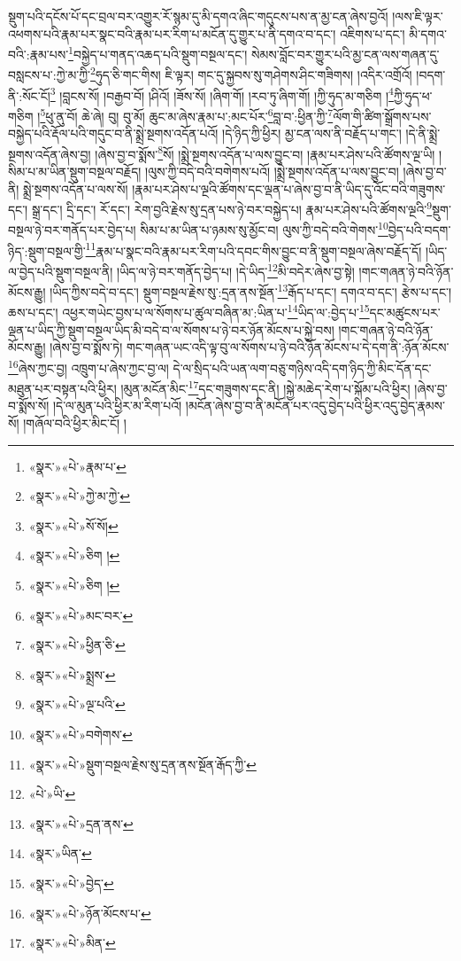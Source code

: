 སྡུག་པའི་དངོས་པོ་དང་བྲལ་བར་འགྱུར་རོ་སྙམ་དུ་མི་དགའ་ཞིང་གདུངས་པས་ན་མྱ་ངན་ཞེས་བྱའོ། །ལས་ཇི་ལྟར་འཕགས་པའི་རྣམ་པར་སྣང་བའི་རྣམ་པར་རིག་པ་མངོན་དུ་གྱུར་པ་ནི་དགའ་བ་དང་། འཇིགས་པ་དང་། མི་དགའ་བའི་:རྣམ་པས་\footnote{«སྣར་»«པེ་»རྣམ་པ་}བསྐྱེད་པ་གནད་འཆད་པའི་སྡུག་བསྔལ་དང་། སེམས་བློང་བར་གྱུར་པའི་མྱ་ངན་ལས་གཞན་དུ་བསླངས་པ་:ཀྱེ་མ་ཀྱི་\footnote{«སྣར་»«པེ་»ཀྱེ་མ་ཀྱེ་}ཧུད་ཅི་གང་གིས། ཇི་ལྟར། གང་དུ་སྐྱབས་སུ་གཤེགས་ཤིང་གཟིགས། །འདིར་འགྲོའོ། །བདག་ནི་:སོང་ངོ།\footnote{«སྣར་»«པེ་»སོ་སོ།} །བླངས་སོ། །བརྒྱབ་བོ། །ཤིའོ། །ཟོས་སོ། །ཞིག་གོ། །རབ་ཏུ་ཞིག་གོ། །ཀྱི་ཧུད་མ་གཅིག །\footnote{«སྣར་»«པེ་»ཅིག །}ཀྱི་ཧུད་ཕ་གཅིག །\footnote{«སྣར་»«པེ་»ཅིག །}ཕུ་ནུ་བོ། ཆེ་ཞེ། བུ། བུ་མོ། ཆུང་མ་ཞེས་རྣམ་པ་:མང་པོར་\footnote{«སྣར་»«པེ་»མང་བར་}བླ་བ་:ཕྱིན་ཀྱི་\footnote{«སྣར་»«པེ་»ཕྱིན་ཅི་}ལོག་གི་ཚིག་སྒྲོགས་པས་བསྐྱེད་པའི་རྡོལ་པའི་གདུང་བ་ནི་སྨྲེ་སྔགས་འདོན་པའོ། །དེ་ཉིད་ཀྱི་ཕྱིར། མྱ་ངན་ལས་ནི་བརྗོད་པ་གང་། །དེ་ནི་སྨྲེ་སྔགས་འདོན་ཞེས་བྱ། །ཞེས་བྱ་བ་སྨོས་\footnote{«སྣར་»«པེ་»སྨྲས་}སོ། །སྨྲེ་སྔགས་འདོན་པ་ལས་བྱུང་བ། །རྣམ་པར་ཤེས་པའི་ཚོགས་ལྔ་ཡི། །སིམ་པ་མ་ཡིན་སྡུག་བསྔལ་བརྗོད། །ལུས་ཀྱི་བདེ་བའི་བགེགས་པའོ། །སྨྲེ་སྔགས་འདོན་པ་ལས་བྱུང་བ། །ཞེས་བྱ་བ་ནི། སྨྲེ་སྔགས་འདོན་པ་ལས་སོ། །རྣམ་པར་ཤེས་པ་ལྔའི་ཚོགས་དང་ལྡན་པ་ཞེས་བྱ་བ་ནི་ཡིད་དུ་འོང་བའི་གཟུགས་དང་། སྒྲ་དང་། དྲི་དང་། རོ་དང་། རེག་བྱའི་རྗེས་སུ་དྲན་པས་ཉེ་བར་བསྐྱེད་པ། རྣམ་པར་ཤེས་པའི་ཚོགས་ལྔའི་\footnote{«སྣར་»«པེ་»ལྔ་པའི་}སྡུག་བསྔལ་ཉེ་བར་གནོད་པར་བྱེད་པ། སིམ་པ་མ་ཡིན་པ་ཉམས་སུ་མྱོང་བ། ལུས་ཀྱི་བདེ་བའི་གེགས་\footnote{«སྣར་»«པེ་»བགེགས་}བྱེད་པའི་བདག་ཉིད་:སྡུག་བསྔལ་གྱི་\footnote{«སྣར་»«པེ་»སྡུག་བསྔལ་རྗེས་སུ་དྲན་ནས་སྔོན་རྒོད་ཀྱི་}རྣམ་པ་སྣང་བའི་རྣམ་པར་རིག་པའི་དབང་གིས་བྱུང་བ་ནི་སྡུག་བསྔལ་ཞེས་བརྗོད་དོ། །ཡིད་ལ་བྱེད་པའི་སྡུག་བསྔལ་ནི། །ཡིད་ལ་ཉེ་བར་གནོད་བྱེད་པ། །དེ་ཡིད་\footnote{«པེ་»ཡི་}མི་བདེར་ཞེས་བྱ་སྟེ། །གང་གཞན་ཉེ་བའི་ཉོན་མོངས་རྒྱུ། །ཡིད་ཀྱིས་བདེ་བ་དང་། སྡུག་བསྔལ་རྗེས་སུ་:དྲན་ནས་སྔོན་\footnote{«སྣར་»«པེ་»དྲན་ནས་}རྒོད་པ་དང་། དགའ་བ་དང་། རྩེས་པ་དང་། ཆས་པ་དང་། འཕྱར་གཡེང་བྱས་པ་ལ་སོགས་པ་ཚུལ་བཞིན་མ་:ཡིན་པ་\footnote{«སྣར་»ཡིན་}ཡིད་ལ་:བྱེད་པ་\footnote{«སྣར་»«པེ་»བྱེད་}དང་མཚུངས་པར་ལྡན་པ་ཡིད་ཀྱི་སྡུག་བསྔལ་ཡིད་མི་བདེ་བ་ལ་སོགས་པ་ཉེ་བར་ཉོན་མོངས་པ་སྐྱེ་བས། །གང་གཞན་ཉེ་བའི་ཉོན་མོངས་རྒྱུ། །ཞེས་བྱ་བ་སྨོས་ཏེ། གང་གཞན་ཡང་འདི་ལྟ་བུ་ལ་སོགས་པ་ཉེ་བའི་ཉོན་མོངས་པ་དེ་དག་ནི་:ཉོན་མོངས་\footnote{«སྣར་»«པེ་»ཉོན་མོངས་པ་}ཞེས་ཀྱང་བྱ། འཁྲུག་པ་ཞེས་ཀྱང་བྱ་ལ། དེ་ལ་སྲིད་པའི་ཡན་ལག་བཅུ་གཉིས་འདི་དག་ཉིད་ཀྱི་མིང་དོན་དང་མཐུན་པར་བསྟན་པའི་ཕྱིར། །མུན་མངོན་མིང་\footnote{«སྣར་»«པེ་»མིན་}དང་གཟུགས་དང་ནི། །སྐྱེ་མཆེད་རེག་པ་སྐོམ་པའི་ཕྱིར། །ཞེས་བྱ་བ་སྨོས་སོ། །དེ་ལ་མུན་པའི་ཕྱིར་མ་རིག་པའོ། །མངོན་ཞེས་བྱ་བ་ནི་མངོན་པར་འདུ་བྱེད་པའི་ཕྱིར་འདུ་བྱེད་རྣམས་སོ། །གཞོལ་བའི་ཕྱིར་མིང་ངོ། །
